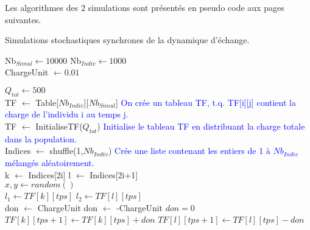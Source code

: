 Les algorithmes des 2 simulations sont présentés en pseudo code aux pages suivantes.

\clearpage

\begin{algorithm}
\caption{Simulations stochastiques synchrones de la dynamique d'échange.}
\begin{algorithmic}

\State Nb$_{Simul} \gets 10000$
\State Nb$_{Indiv} \gets 1000$\\

\State ChargeUnit $\gets 0.01$

\State $Q_{tot} \gets 500$\\


\State TF $\gets$ Table[$Nb_{Indiv}$][$Nb_{Simul}$]
\State \textcolor{blue}{On crée un tableau TF, t.q. TF[i][j] contient la charge de l'individu i au temps j.}\\
\State TF $\gets$ InitialiseTF($Q_{tot}$)
\State \textcolor{blue}{Initialise le tableau TF en distribuant la charge totale dans la population.}\\

	\State Indices $\gets$ shuffle(1,$Nb_{Indiv}$) 
	\State \textcolor{blue}{Crée une liste contenant les entiers de 1 à $Nb_{Indiv}$ mélangés aléatoirement.}\\
		\State k $\gets$ Indices[2i]
		\State l $\gets$ Indices[2i+1] \\
		
		\State $x,y \gets random()$\\
		
		\State $l_1 \gets TF[k][tps]$
		\State $l_2 \gets TF[l][tps]$\\
		
			\State don $\gets$ ChargeUnit 
			\State don $\gets$ -ChargeUnit 
		\Else
			\State $don=0$
		\EndIf \\
		
		\State $TF[k][tps+1] \gets TF[k][tps]+don$
        \State $TF[l][tps+1] \gets TF[l][tps]-don$\\
	\EndFor
\EndFor



\end{algorithmic}
\end{algorithm}



